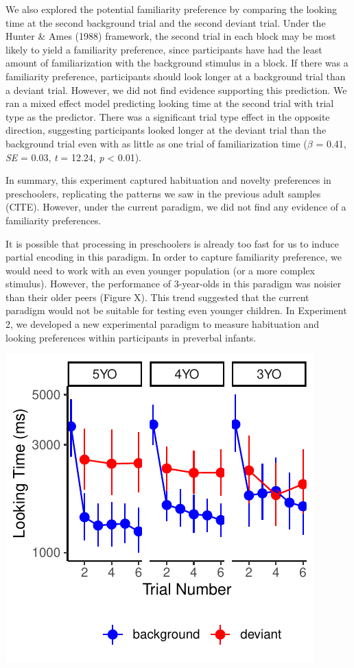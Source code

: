 \documentclass[10pt, letterpaper]{article}
\newenvironment{CodeChunk}{}{}
\begin{document}
We also explored the potential familiarity preference by comparing the
looking time at the second background trial and the second deviant
trial. Under the Hunter \& Ames (1988) framework, the second trial in
each block may be most likely to yield a familiarity preference, since
participants have had the least amount of familiarization with the
background stimulus in a block. If there was a familiarity preference,
participants should look longer at a background trial than a deviant
trial. However, we did not find evidence supporting this prediction. We
ran a mixed effect model predicting looking time at the second trial
with trial type as the predictor. There was a significant trial type
effect in the opposite direction, suggesting participants looked longer
at the deviant trial than the background trial even with as little as
one trial of familiarization time (\(\beta\) = 0.41, \emph{SE} = 0.03,
\emph{t} = 12.24, \emph{p} \textless{} 0.01).

In summary, this experiment captured habituation and novelty preferences
in preschoolers, replicating the patterns we saw in the previous adult
samples (CITE). However, under the current paradigm, we did not find any
evidence of a familiarity preferences.

It is possible that processing in preschoolers is already too fast for
us to induce partial encoding in this paradigm. In order to capture
familiarity preference, we would need to work with an even younger
population (or a more complex stimulus). However, the performance of
3-year-olds in this paradigm was noisier than their older peers (Figure
X). This trend suggested that the current paradigm would not be suitable
for testing even younger children. In Experiment 2, we developed a new
experimental paradigm to measure habituation and looking preferences
within participants in preverbal infants.

\begin{CodeChunk}

\includegraphics{figs/unnamed-chunk-13-1} \end{CodeChunk}
\end{document}
